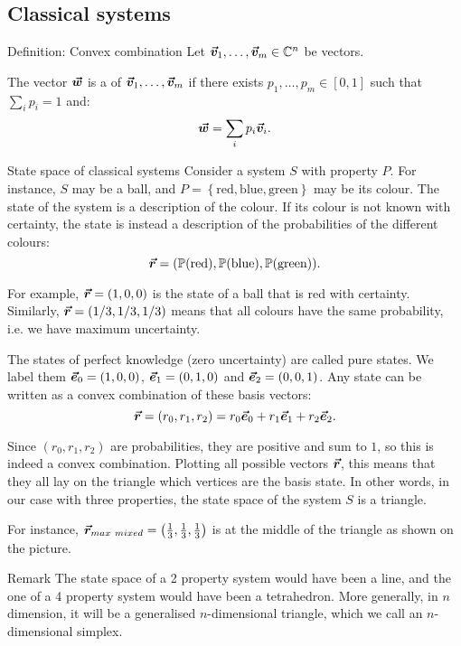 \documentclass[a4paper]{article}
\begin{document}
\subsection{Classical systems}

\begin{parag}{Definition: Convex combination}
    Let $\bm{\protect\vec{v}}_1, \ldots, \bm{\protect\vec{v}}_m \in \mathbb{C}^n$ be vectors.

    The vector $\bm{\protect\vec{w}}$ is a  of $\bm{\protect\vec{v}}_1, \ldots, \bm{\protect\vec{v}}_m$ if there exists $p_1, \ldots, p_m \in \left[0, 1\right]$ such that $\sum_{i} p_i = 1$ and: 
    \[\bm{\protect\vec{w}} = \sum_{i} p_i \bm{\protect\vec{v}}_i.\]
\end{parag}

\begin{parag}{State space of classical systems}
    Consider a system $S$ with property $P$. For instance, $S$ may be a ball, and $P = \left\{\text{red}, \text{blue}, \text{green}\right\}$ may be its colour. The state of the system is a description of the colour. If its colour is not known with certainty, the state is instead a description of the probabilities of the different colours: 
    \[\bvec{r} = \left(\prob\left(\text{red}\right), \prob\left(\text{blue}\right), \prob\left(\text{green}\right)\right).\]
    
    For example, $\bvec{r} = \left(1, 0, 0\right)$ is the state of a ball that is red with certainty. Similarly, $\bvec{r} = \left(1/3, 1/3, 1/3\right)$ means that all colours have the same probability, i.e. we have maximum uncertainty.

    The states of perfect knowledge (zero uncertainty) are called pure states. We label them $\bvec{e}_0 = \left(1, 0, 0\right)$, $\bvec{e}_1 = \left(0, 1, 0\right)$ and $\bvec{e}_2 = \left(0, 0, 1\right)$. Any state can be written as a convex combination of these basis vectors: 
    \[\bvec{r} = \left(r_0, r_1, r_2\right) =  r_0 \bvec{e}_0 + r_1 \bvec{e}_1 + r_2 \bvec{e}_2.\]

    Since $\left(r_0, r_1, r_2\right)$ are probabilities, they are positive and sum to $1$, so this is indeed a convex combination. Plotting all possible vectors $\bm{\protect\vec{r}}$, this means that they all lay on the triangle which vertices are the basis state. In other words, in our case with three properties, the state space of the system $S$ is a triangle.

    For instance, $\bvec{r}_{max\ mixed} = \left(\frac{1}{3}, \frac{1}{3}, \frac{1}{3}\right)$ is at the middle of the triangle as shown on the picture.

    \begin{subparag}{Remark}
        The state space of a 2 property system would have been a line, and the one of a 4 property system would have been a tetrahedron. More generally, in $n$ dimension, it will be a generalised $n$-dimensional triangle, which we call an $n$-dimensional simplex.
    \end{subparag}
\end{parag}
\end{document}
